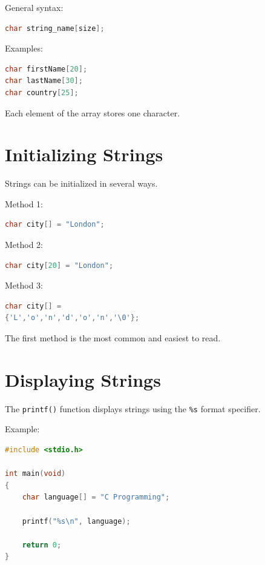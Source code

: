 \documentclass[12pt,openany]{book}
\begin{document}
General syntax:

\begin{lstlisting}[language=C]
char string_name[size];
\end{lstlisting}

Examples:

\begin{lstlisting}[language=C]
char firstName[20];
char lastName[30];
char country[25];
\end{lstlisting}

Each element of the array stores one character.

\section{Initializing Strings}

Strings can be initialized in several ways.

Method 1:

\begin{lstlisting}[language=C]
char city[] = "London";
\end{lstlisting}

Method 2:

\begin{lstlisting}[language=C]
char city[20] = "London";
\end{lstlisting}

Method 3:

\begin{lstlisting}[language=C]
char city[] =
{'L','o','n','d','o','n','\0'};
\end{lstlisting}

The first method is the most common and easiest to read.

\section{Displaying Strings}

The \texttt{printf()} function displays strings using the \texttt{\%s} format specifier.

Example:

\begin{lstlisting}[language=C]
#include <stdio.h>

int main(void)
{
    char language[] = "C Programming";

    printf("%s\n", language);

    return 0;
}
\end{lstlisting}
\end{document}
